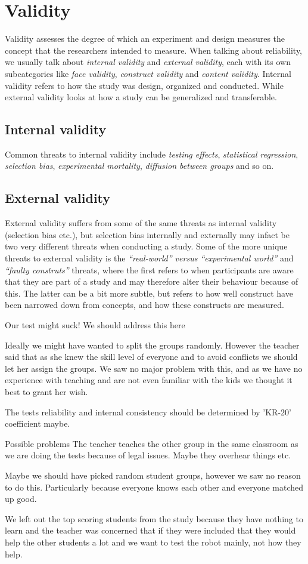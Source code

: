 \section{Validity}
	Validity assesses the degree of which an experiment and design measures the concept that the researchers intended to measure.
	When talking about reliability, we usually talk about \textit{internal validity} and \textit{external validity}, each with its own subcategories like \textit{face validity}, \textit{construct validity} and \textit{content validity}.
	Internal validity refers to how the study was design, organized and conducted. While external validity looks at how a study can be generalized and transferable.
	
	\subsection{Internal validity}
	Common threats to internal validity include \textit{testing effects}, \textit{statistical regression}, \textit{selection bias}, \textit{experimental mortality}, \textit{diffusion between groups} and so on. 
	
	\subsection{External validity}
	External validity suffers from some of the same threats as internal validity (selection bias etc.), but selection bias internally and externally may infact be two very different threats when conducting a study.
	Some of the more unique threats to external validity is the \textit{"`real-world"' versus "`experimental world"'} and \textit{"`faulty construts"'} threats, where the first refers to when participants are aware that they are part of a study and may therefore alter their behaviour because of this. The latter can be a bit more subtle, but refers to how well construct have been narrowed down from concepts, and how these constructs are measured.

Our test might suck! We should address this here

Ideally we might have wanted to split the groups randomly. 
However the teacher said that as she knew the skill level of everyone and to avoid conflicts we should let her assign the groups. 
We saw no major problem with this, and as we have no experience with teaching and are not even familiar with the kids we thought it best to grant her wish.

The tests reliability and internal consistency should be determined by 'KR-20' coefficient maybe. 

Possible problems
The teacher teaches the other group in the same classroom as we are doing the tests because of legal issues. 
Maybe they overhear things etc. 

Maybe we should have picked random student groups, however we saw no reason to do this. 
Particularly because everyone knows each other and everyone matched up good. 

We left out the top scoring students from the study because they have nothing to learn and the teacher was concerned that if they were included that they would help the other students a lot and we want to test the robot mainly, not how they help. 
